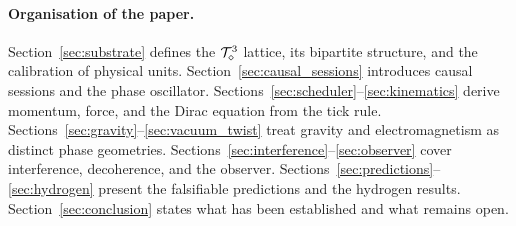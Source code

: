 \paragraph{Organisation of the paper.}
Section~\ref{sec:substrate} defines the $\mathcal{T}_\diamond^3$ lattice, its
bipartite structure, and the calibration of physical units.
Section~\ref{sec:causal_sessions} introduces causal sessions and the
phase oscillator.
Sections~\ref{sec:scheduler}--\ref{sec:kinematics} derive
momentum, force, and the Dirac equation from the tick rule.
Sections~\ref{sec:gravity}--\ref{sec:vacuum_twist} treat gravity
and electromagnetism as distinct phase geometries.
Sections~\ref{sec:interference}--\ref{sec:observer} cover interference,
decoherence, and the observer.
Sections~\ref{sec:predictions}--\ref{sec:hydrogen} present the
falsifiable predictions and the hydrogen results.
Section~\ref{sec:conclusion} states what has been established and
what remains open.

\bigskip

